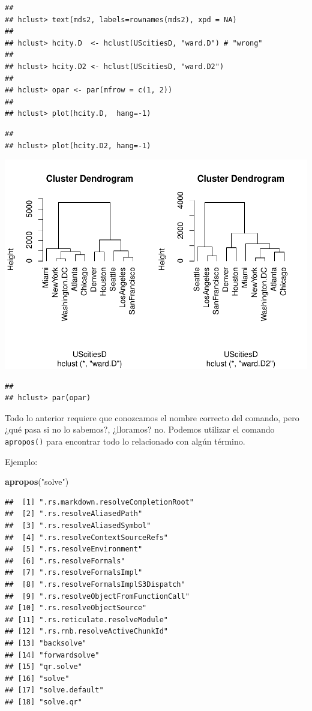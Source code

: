 \documentclass[
]{book}
\newenvironment{Shaded}{\begin{snugshade}}{\end{snugshade}}
\newcommand{\FunctionTok}[1]{\textcolor[rgb]{0.13,0.29,0.53}{\textbf{#1}}}
\newcommand{\NormalTok}[1]{#1}
\newcommand{\StringTok}[1]{\textcolor[rgb]{0.31,0.60,0.02}{#1}}
\begin{document}
\begin{verbatim}
## 
## hclust> text(mds2, labels=rownames(mds2), xpd = NA)
## 
## hclust> hcity.D  <- hclust(UScitiesD, "ward.D") # "wrong"
## 
## hclust> hcity.D2 <- hclust(UScitiesD, "ward.D2")
## 
## hclust> opar <- par(mfrow = c(1, 2))
## 
## hclust> plot(hcity.D,  hang=-1)
\end{verbatim}

\begin{verbatim}
## 
## hclust> plot(hcity.D2, hang=-1)
\end{verbatim}

\includegraphics{bookdown-demo_files/figure-latex/unnamed-chunk-11-5.pdf}

\begin{verbatim}
## 
## hclust> par(opar)
\end{verbatim}

Todo lo anterior requiere que conozcamos el nombre correcto del comando, pero ¿qué pasa si no lo sabemos?, ¿lloramos? no.
Podemos utilizar el comando \texttt{apropos()} para encontrar todo lo relacionado con algún término.

Ejemplo:

\begin{Shaded}
\begin{Highlighting}[]
\FunctionTok{apropos}\NormalTok{(}\StringTok{"solve"}\NormalTok{)}
\end{Highlighting}
\end{Shaded}

\begin{verbatim}
##  [1] ".rs.markdown.resolveCompletionRoot"
##  [2] ".rs.resolveAliasedPath"            
##  [3] ".rs.resolveAliasedSymbol"          
##  [4] ".rs.resolveContextSourceRefs"      
##  [5] ".rs.resolveEnvironment"            
##  [6] ".rs.resolveFormals"                
##  [7] ".rs.resolveFormalsImpl"            
##  [8] ".rs.resolveFormalsImplS3Dispatch"  
##  [9] ".rs.resolveObjectFromFunctionCall" 
## [10] ".rs.resolveObjectSource"           
## [11] ".rs.reticulate.resolveModule"      
## [12] ".rs.rnb.resolveActiveChunkId"      
## [13] "backsolve"                         
## [14] "forwardsolve"                      
## [15] "qr.solve"                          
## [16] "solve"                             
## [17] "solve.default"                     
## [18] "solve.qr"
\end{verbatim}
\end{document}
